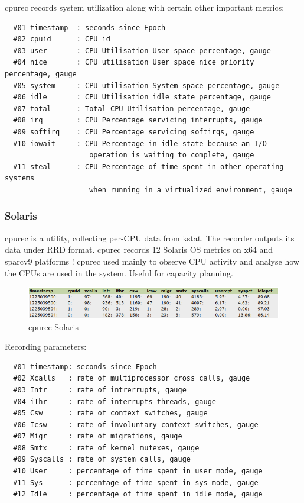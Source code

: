 \noindent
cpurec records system utilization along with certain other important metrics:

\begin{verbatim}
  #01 timestamp  : seconds since Epoch
  #02 cpuid      : CPU id
  #03 user       : CPU Utilisation User space percentage, gauge
  #04 nice       : CPU utilisation User space nice priority percentage, gauge
  #05 system     : CPU utilisation System space percentage, gauge
  #06 idle       : CPU Utilisation idle state percentage, gauge
  #07 total      : Total CPU Utilisation percentage, gauge
  #08 irq        : CPU Percentage servicing interrupts, gauge
  #09 softirq    : CPU Percentage servicing softirqs, gauge
  #10 iowait     : CPU Percentage in idle state because an I/O 
                    operation is waiting to complete, gauge
  #11 steal      : CPU Percentage of time spent in other operating systems 
                    when running in a virtualized environment, gauge
\end{verbatim}


\subsubsection{Solaris}
cpurec is a utility, collecting per-CPU data from kstat. The recorder outputs
its data under RRD format. cpurec records 12 Solaris OS metrics on x64 and
sparcv9 platforms !  cpurec used mainly to observe CPU activity and
analyse how the CPUs are used in the system. Useful for capacity planning.

\begin{figure}[!ht]
\centering
\includegraphics[scale=0.62]{cpurec_sol.png}
\caption{cpurec Solaris}
\label{fig:cpurec_sol}
\end{figure}

\noindent
Recording parameters:

\begin{verbatim}
  #01 timestamp: seconds since Epoch
  #02 Xcalls   : rate of multiprocessor cross calls, gauge
  #03 Intr     : rate of intrerrupts, gauge
  #04 iThr     : rate of interrupts threads, gauge
  #05 Csw      : rate of context switches, gauge
  #06 Icsw     : rate of involuntary context switches, gauge
  #07 Migr     : rate of migrations, gauge
  #08 Smtx     : rate of kernel mutexes, gauge
  #09 Syscalls : rate of system calls, gauge
  #10 User     : percentage of time spent in user mode, gauge
  #11 Sys      : percentage of time spent in sys mode, gauge
  #12 Idle     : percentage of time spent in idle mode, gauge
\end{verbatim}


